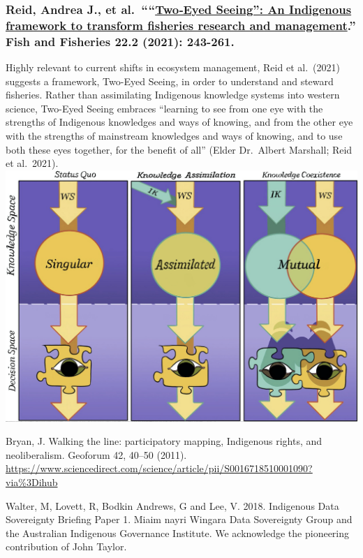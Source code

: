 \documentclass[
]{book}
\begin{document}
\hypertarget{reid-andrea-j.-et-al.-twoeyed-seeing-an-indigenous-framework-to-transform-fisheries-research-and-management.-fish-and-fisheries-22.2-2021-243-261.}{%
\subsubsection*{\texorpdfstring{Reid, Andrea J., et al.~````\href{https://onlinelibrary.wiley.com/doi/full/10.1111/faf.12516}{Two‐Eyed Seeing'': An Indigenous framework to transform fisheries research and management}.'' Fish and Fisheries 22.2 (2021): 243-261.}{Reid, Andrea J., et al.~``\,``Two‐Eyed Seeing'': An Indigenous framework to transform fisheries research and management.'' Fish and Fisheries 22.2 (2021): 243-261.}}\label{reid-andrea-j.-et-al.-twoeyed-seeing-an-indigenous-framework-to-transform-fisheries-research-and-management.-fish-and-fisheries-22.2-2021-243-261.}}

Highly relevant to current shifts in ecosystem management, Reid et al.~(2021) suggests a framework, Two-Eyed Seeing, in order to understand and steward fisheries. Rather than assimilating Indigenous knowledge systems into western science, Two-Eyed Seeing embraces ``learning to see from one eye with the strengths of Indigenous knowledges and ways of knowing, and from the other eye with the strengths of mainstream knowledges and ways of knowing, and to use both these eyes together, for the benefit of all'' (Elder Dr.~Albert Marshall; Reid et al.~2021).
\includegraphics{images/Reid_2021.png}

Bryan, J. Walking the line: participatory mapping, Indigenous rights, and neoliberalism. Geoforum 42, 40--50 (2011). \url{https://www.sciencedirect.com/science/article/pii/S0016718510001090?via\%3Dihub}

Walter, M, Lovett, R, Bodkin Andrews, G and Lee, V. 2018. Indigenous Data Sovereignty Briefing Paper 1. Miaim nayri Wingara Data Sovereignty Group and the Australian Indigenous Governance Institute. We acknowledge the pioneering contribution of John Taylor.

  
\end{document}
